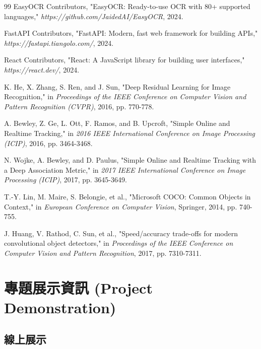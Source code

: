 \documentclass[a4paper,14pt,oneside]{article}
\begin{document}
\begin{thebibliography}{99}
     EasyOCR Contributors, "EasyOCR: Ready-to-use OCR with 80+ supported languages," \textit{https://github.com/JaidedAI/EasyOCR}, 2024.
    
     FastAPI Contributors, "FastAPI: Modern, fast web framework for building APIs," \textit{https://fastapi.tiangolo.com/}, 2024.
    
     React Contributors, "React: A JavaScript library for building user interfaces," \textit{https://react.dev/}, 2024.
    
     K. He, X. Zhang, S. Ren, and J. Sun, "Deep Residual Learning for Image Recognition," in \textit{Proceedings of the IEEE Conference on Computer Vision and Pattern Recognition (CVPR)}, 2016, pp. 770-778.
    
     A. Bewley, Z. Ge, L. Ott, F. Ramos, and B. Upcroft, "Simple Online and Realtime Tracking," in \textit{2016 IEEE International Conference on Image Processing (ICIP)}, 2016, pp. 3464-3468.
    
     N. Wojke, A. Bewley, and D. Paulus, "Simple Online and Realtime Tracking with a Deep Association Metric," in \textit{2017 IEEE International Conference on Image Processing (ICIP)}, 2017, pp. 3645-3649.
    
     T.-Y. Lin, M. Maire, S. Belongie, et al., "Microsoft COCO: Common Objects in Context," in \textit{European Conference on Computer Vision}, Springer, 2014, pp. 740-755.
    
     J. Huang, V. Rathod, C. Sun, et al., "Speed/accuracy trade-offs for modern convolutional object detectors," in \textit{Proceedings of the IEEE Conference on Computer Vision and Pattern Recognition}, 2017, pp. 7310-7311.
\end{thebibliography}

\newpage
\section*{專題展示資訊 (Project Demonstration)}

\subsection*{線上展示}
\end{document}

